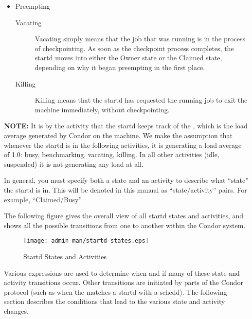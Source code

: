 \begin{itemize}
\begin{description}
\end{description}

\item Preempting
\begin{description}
  
\item[Vacating] Vacating simply means that the job that was running is
  in the process of checkpointing.  As soon as the checkpoint process
  completes, the startd moves into either the Owner state or the
  Claimed state, depending on why it began preempting in the first
  place.
  
\item[Killing] Killing means that the startd has requested the running
  job to exit the machine immediately, without checkpointing.

\end{description}

\end{itemize}

\textbf{NOTE:} It is by the activity that the startd keeps track of
the , which is the load average generated by
Condor on the machine.  We make the assumption that whenever the
startd is in the following activities, it is generating a load average
of 1.0: busy, benchmarking, vacating, killing.  In all other
activities (idle, suspended) it is not generating any load at all.

In general, you must specify both a state and an activity to describe
what ``state'' the startd is in.  This will be denoted in this manual
as ``state/activity'' pairs.  For example, ``Claimed/Busy''

The following figure gives the overall view of all startd states and
activities, and shows all the possible transitions from one to another
within the Condor system.

\begin{figure} \centering
\texttt{[image: admin-man/startd-states.eps]}
\caption{\label{startd-states}Startd States and Activities}
\end{figure}

Various expressions are used to determine when and if many of these
state and activity transitions occur.  Other transitions are initiated
by parts of the Condor protocol (such as when the 
matches a startd with a schedd).  The following section describes the
conditions that lead to the various state and activity changes.

